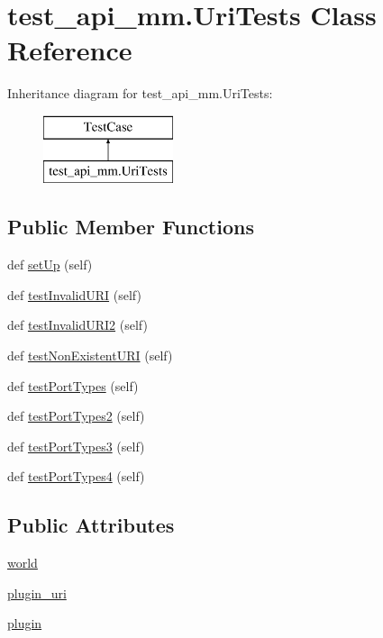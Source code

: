 \hypertarget{classtest__api__mm_1_1_uri_tests}{}\section{test\+\_\+api\+\_\+mm.\+Uri\+Tests Class Reference}
\label{classtest__api__mm_1_1_uri_tests}
Inheritance diagram for test\+\_\+api\+\_\+mm.\+Uri\+Tests\+:\begin{figure}[H]
\begin{center}
\leavevmode
\includegraphics[height=2.000000cm]{classtest__api__mm_1_1_uri_tests}
\end{center}
\end{figure}
\subsection*{Public Member Functions}
\begin{DoxyCompactItemize}
\item 
def \hyperlink{classtest__api__mm_1_1_uri_tests_aecfa77a46a2fe80def719f67074a9e41}{set\+Up} (self)
\item 
def \hyperlink{classtest__api__mm_1_1_uri_tests_aaab51f2b956b8c2801e3bfd5324bece2}{test\+Invalid\+U\+RI} (self)
\item 
def \hyperlink{classtest__api__mm_1_1_uri_tests_acc30d9454d1c3e952b9ec15cf4a54c04}{test\+Invalid\+U\+R\+I2} (self)
\item 
def \hyperlink{classtest__api__mm_1_1_uri_tests_a794841e7465d07d8f3af6495f8d22e26}{test\+Non\+Existent\+U\+RI} (self)
\item 
def \hyperlink{classtest__api__mm_1_1_uri_tests_affbd6b784624875414681849cab5c42a}{test\+Port\+Types} (self)
\item 
def \hyperlink{classtest__api__mm_1_1_uri_tests_a12558f26b8edd93303d1daadcad9ae4e}{test\+Port\+Types2} (self)
\item 
def \hyperlink{classtest__api__mm_1_1_uri_tests_a752bf366494c18c444f539c8423399d3}{test\+Port\+Types3} (self)
\item 
def \hyperlink{classtest__api__mm_1_1_uri_tests_a8d8d645e7c472955a778ef92b20b9ba7}{test\+Port\+Types4} (self)
\end{DoxyCompactItemize}
\subsection*{Public Attributes}
\begin{DoxyCompactItemize}
\item 
\hyperlink{classtest__api__mm_1_1_uri_tests_a44c0154929af0df42fd1d4d18415de97}{world}
\item 
\hyperlink{classtest__api__mm_1_1_uri_tests_a62cfb1d284051d3de976cac021e28f0c}{plugin\+\_\+uri}
\item 
\hyperlink{classtest__api__mm_1_1_uri_tests_ac2deac5574169aaa5300ae8f8cabc9cc}{plugin}
\end{DoxyCompactItemize}


